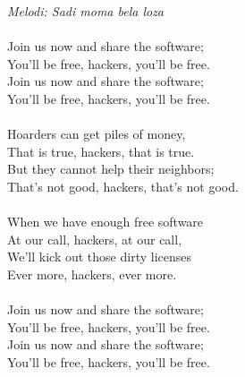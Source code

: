 {\footnotesize\textit{Melodi: Sadi moma bela loza}}\\
\\
Join us now and share the software;\\
You'll be free, hackers, you'll be free.\\
Join us now and share the software;\\
You'll be free, hackers, you'll be free.\\
\\
Hoarders can get piles of money,\\
That is true, hackers, that is true.\\
But they cannot help their neighbors;\\
That's not good, hackers, that's not good.\\
\\
When we have enough free software\\
At our call, hackers, at our call,\\
We'll kick out those dirty licenses\\
Ever more, hackers, ever more.\\
\\
Join us now and share the software;\\
You'll be free, hackers, you'll be free.\\
Join us now and share the software;\\
You'll be free, hackers, you'll be free.\\
